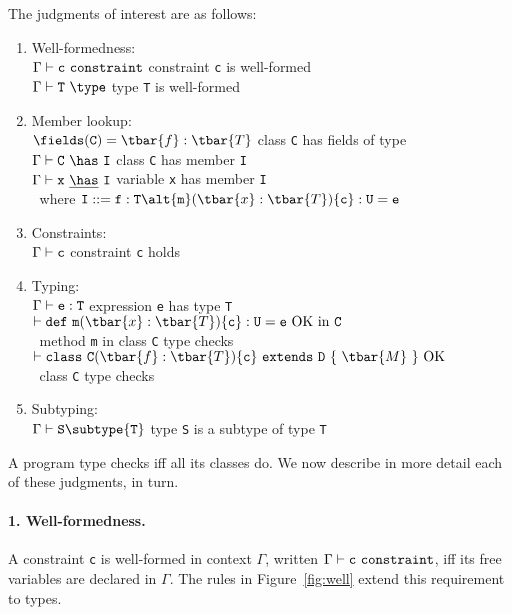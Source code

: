 The judgments of interest are as follows:
\begin{enumerate}
	\item Well-formedness:\\
	  $\cj{\Gamma}{\tt c}$ \hfill constraint {\tt c} is well-formed\\
	  $\wj{\Gamma}{\tt T}$ \hfill  type {\tt T} is well-formed
	\item Member lookup:\\
	  $\fields({\tt C})=\tbar{f}:\tbar{T}$ \hfill class {\tt C} has fields  of type \\
	  $\Gamma\vdash {\tt C}~\has~{\tt I}$ \hfill class {\tt C} has member {\tt I}\\
	  $\Gamma\vdash {\tt x}~\underline\has~{\tt I}$ \hfill variable {\tt x} has member {\tt I}\\
	  $~$ \hfill where ${\tt I}::= {\tt f}:{\tt T} \alt {\tt m}(\tbar{x}:\tbar{T})\{{\tt c}\}:{\tt U}={\tt e}$
	\item Constraints:\\
	  $\Gamma\vdash {\tt c}$ \hfill constraint {\tt c} holds
	\item Typing:\\
	  $\Gamma\vdash {\tt e}:{\tt T}$ \hfill expression {\tt e} has type {\tt T}\\
	  $\vdash {\tt def}~{\tt m}(\tbar{x}:\tbar{T})\{{\tt c}\}:{\tt U}={\tt e}~{\rm OK~in}~{\tt C}$ \\ $~$ \hfill method {\tt m} in class {\tt C} type checks\\
	  $\vdash {\tt class}~{\tt C}(\tbar{f}:\tbar{T})\{{\tt c}\}~{\tt extends}~{\tt D}~\{~\tbar{M}~\}~{\rm OK}$ \\ $~$ \hfill class {\tt C} type checks
	\item Subtyping:\\
	  $\Gamma \vdash {\tt S} \subtype {\tt T}$ \hfill type {\tt S} is a subtype of type {\tt T}
\end{enumerate}

\medskip

A program type checks iff all its classes do.  We now describe
in more detail each of these judgments, in turn.

\paragraph{1. Well-formedness.} A constraint {\tt c} is well-formed in context $\Gamma$, written $\cj{\Gamma}{\tt c}$, iff its free variables are declared in $\Gamma$. The rules in Figure~\ref{fig:well} extend this requirement to types.

